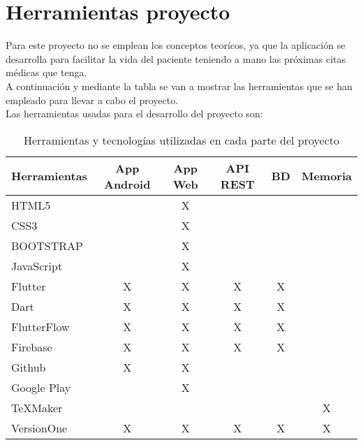 
\section{Herramientas proyecto}
\label{herramientasportipodeuso}
Para este proyecto no se emplean los conceptos teorícos, ya que la aplicación se desarrolla para facilitar la vida del paciente teniendo a mano las próximas citas médicas que tenga. \\

A continuación y mediante la tabla se van a mostrar las herramientas que se han empleado para llevar a cabo el proyecto. \\

Las herramientas usadas para el desarrollo del proyecto son:
\vspace*{-1cm}
\begin{table}
	 \vspace*{-2.5cm}
	 \begin{center}
		\begin{tabular}{l c c c c c}
			\toprule
				Herramientas & App Android & App Web & API REST & BD & Memoria   \\
			\midrule
				HTML5 & & X & & & \\
				CSS3 & & X & & &\\
				BOOTSTRAP & & X & & &\\
				JavaScript & & X & & &\\
				Flutter & X & X & X & X &\\
				Dart & X & X & X & X &\\
				FlutterFlow & X & X & X & X &\\
				Firebase & X & X & X & X &\\
				Github & X & X & & &\\
				Google Play & & X & & &\\
				\TeX{}Maker & & & &  & X\\
				VersionOne & X & X & X & X & X\\
			\bottomrule
		\end{tabular}
	\end{center}
	\caption{Herramientas y tecnologías utilizadas en cada parte del proyecto}
	\label{herramientasportipodeuso}
	\vspace*{3cm}
\end{table}
